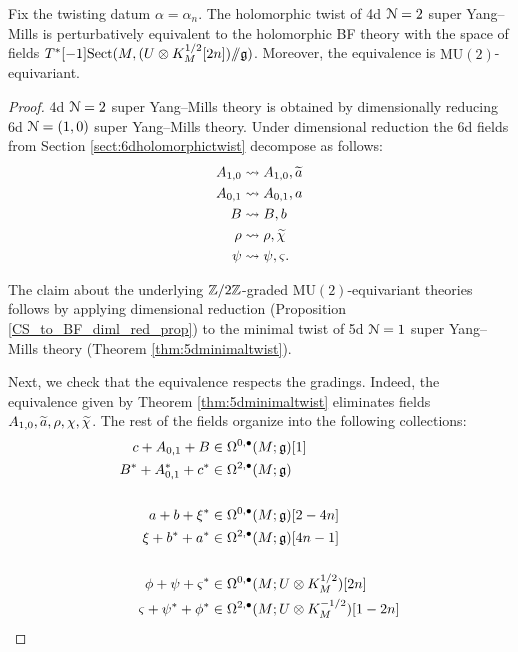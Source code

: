 \documentclass[10pt, oneside]{article}
\newcommand{\MU}{\mathrm{MU}}
\newcommand{\Sect}{\mathrm{Sect}}
\newcommand{\ham}{/\!\!/}
\begin{document}
\begin{theorem}
Fix the twisting datum $\alpha = \alpha_n$. The holomorphic twist of 4d $\cN=2$ super Yang--Mills is perturbatively equivalent to the holomorphic BF theory with the space of fields $T^*[-1] \Sect(M, (U\otimes K_M^{1/2}[2n])\ham \fg)$. Moreover, the equivalence is $\MU(2)$-equivariant.
\label{thm:4dholomorphictwist}
\end{theorem}
\begin{proof}
4d $\cN=2$ super Yang--Mills theory is obtained by dimensionally reducing 6d $\cN=(1,0)$ super Yang--Mills theory. Under dimensional reduction the 6d fields from Section \ref{sect:6dholomorphictwist} decompose as follows:
\begin{align*}
A_{1, 0}&\rightsquigarrow A_{1, 0}, \Tilde{a} \\
A_{0, 1}&\rightsquigarrow A_{0, 1}, a \\
B&\rightsquigarrow B, b \\
\rho&\rightsquigarrow \rho, \Tilde{\chi} \\
\psi & \rightsquigarrow \psi, \varsigma . \\
\end{align*}

The claim about the underlying $\ZZ/2\ZZ$-graded $\MU(2)$-equivariant theories follows by applying dimensional reduction (Proposition \ref{CS_to_BF_diml_red_prop}) to the minimal twist of 5d $\cN=1$ super Yang--Mills theory (Theorem \ref{thm:5dminimaltwist}).

Next, we check that the equivalence respects  the gradings. Indeed, the equivalence given by Theorem \ref{thm:5dminimaltwist} eliminates fields $A_{1, 0}, \Tilde{a}, \rho, \chi, \Tilde{\chi}$. The rest of the fields organize into the following collections:
\begin{align*}
c+A_{0, 1}+B&\in\Omega^{0, \bullet}(M; \fg)[1] \\
B^*+A^*_{0, 1}+ c^*&\in\Omega^{2, \bullet}(M; \fg) \\
\\
a + b + \xi^*&\in\Omega^{0, \bullet}(M; \fg)[2-4n] \\
\xi + b^* + a^*&\in\Omega^{2, \bullet}(M; \fg)[4n-1] \\
\\
\phi + \psi + \varsigma^*&\in\Omega^{0, \bullet}(M; U\otimes K_M^{1/2})[2n] \\
\varsigma + \psi^* + \phi^* &\in\Omega^{2, \bullet}(M; U\otimes K_M^{-1/2})[1-2n]
\end{align*}


\end{proof}
\end{document}

